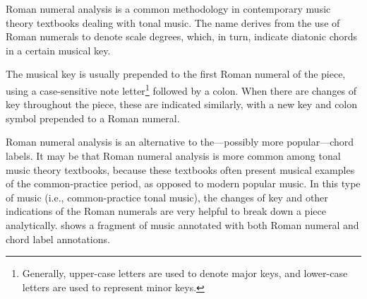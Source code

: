 Roman numeral analysis is a common methodology in
contemporary music theory textbooks dealing with tonal
music. The name derives from the use of Roman numerals to
denote scale degrees, which, in turn, indicate diatonic
chords in a certain musical key.

The musical key is usually prepended to the first Roman
numeral of the piece, using a case-sensitive note
letter\footnote{Generally, upper-case letters are used to
denote major keys, and lower-case letters are used to
represent minor keys.} followed by a colon. When there are
changes of key throughout the piece, these are indicated
similarly, with a new key and colon symbol prepended to a
Roman numeral.

Roman numeral analysis is an alternative to the---possibly
more popular---chord labels. It may be that Roman numeral
analysis is more common among tonal music theory textbooks,
because these textbooks often present musical examples of
the common-practice period, as opposed to modern popular
music. In this type of music (i.e., common-practice tonal
music), the changes of key and other indications of the
Roman numerals are very helpful to break down a piece
analytically.  shows a fragment of music
annotated with both Roman numeral and chord label
annotations.

